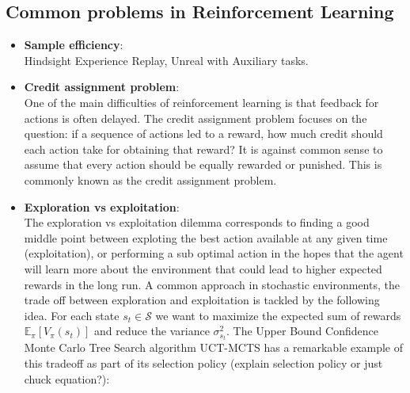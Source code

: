 \documentclass{article}
\begin{document}
\subsection{Common problems in Reinforcement Learning}
\begin{itemize}
    \item \textbf{Sample efficiency}: \\
        Hindsight Experience Replay, Unreal with Auxiliary tasks.
    \item \textbf{Credit assignment problem}: \\
        One of the main difficulties of reinforcement learning is that feedback for actions is often delayed. The credit assignment problem focuses on the question: if a sequence of actions led to a reward, how much credit should each action take for obtaining that reward? It is against common sense to assume that every action should be equally rewarded or punished. This is commonly known as the credit assignment problem.
    \item \textbf{Exploration vs exploitation}: \\
The exploration vs exploitation dilemma corresponds to finding a good middle point between exploting the best action available at any given time (exploitation), or performing a sub optimal action in the hopes that the agent will learn more about the environment that could lead to higher expected rewards in the long run. A common approach in stochastic environments, the trade off between exploration and exploitation is tackled by the following idea. For each state $s_t \in \mathcal{S}$ we want to maximize the expected sum of rewards $\mathbb{E}_{\pi}[V_{\pi}(s_t)]$ and reduce the variance $\sigma^2_{s_t}$. The Upper Bound Confidence Monte Carlo Tree Search algorithm UCT-MCTS has a remarkable example of this tradeoff as part of its selection policy (explain selection policy or just chuck equation?):
\end{itemize}
\end{document}
